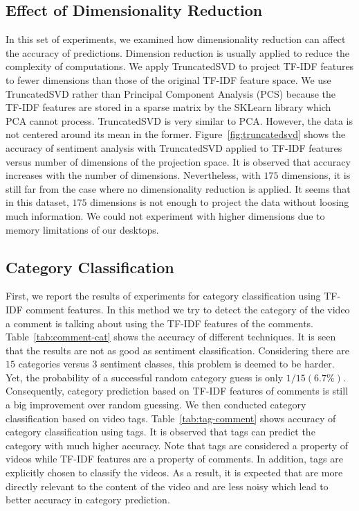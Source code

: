 \subsection{Effect of Dimensionality Reduction}
\label{sec:dim-reduction}
In this set of experiments, we examined how dimensionality reduction can affect the accuracy of predictions. Dimension reduction is usually applied to reduce the complexity of computations. We apply TruncatedSVD to project TF-IDF features to fewer dimensions than those of the original TF-IDF feature space. We use TruncatedSVD rather than Principal Component Analysis (PCS) because the TF-IDF features are stored in a sparse matrix by the SKLearn library which PCA cannot process. TruncatedSVD is very similar to PCA. However, the data is not centered around its mean in the former.
Figure~\ref{fig:truncatedsvd} shows the accuracy of sentiment analysis with TruncatedSVD applied to TF-IDF features versus number of dimensions of the projection space. It is observed that accuracy increases with the number of dimensions. Nevertheless, with $175$ dimensions, it is still far from the case where no dimensionality reduction is applied. It seems that in this dataset, $175$ dimensions is not enough to project the data without loosing much information. We could not experiment with higher dimensions due to memory limitations of our desktops.

\subsection{Category Classification}
\label{sec:cat-exp}

First, we report the results of experiments for category classification using TF-IDF comment features. In this method we try to detect the category of the video a comment is talking about using the TF-IDF features of the comments. Table~\ref{tab:comment-cat} shows the accuracy of different techniques. It is seen that the results are not as good as sentiment classification. Considering there are $15$ categories versus $3$ sentiment classes, this problem is deemed to be harder. Yet, the probability of a successful random category guess is only $1/15 (6.7\%)$. Consequently, category prediction based on TF-IDF features of comments is still a big improvement over random guessing.
We then conducted category classification based on video tags. Table~\ref{tab:tag-comment} shows accuracy of category classification using tags. It is observed that tags can predict the category with much higher accuracy. Note that tags are considered a property of videos while TF-IDF features are a property of comments. In addition, tags are explicitly chosen to classify the videos. As a result, it is expected that are more directly relevant to the content of the video and are less noisy which lead to better accuracy in category prediction.
 
